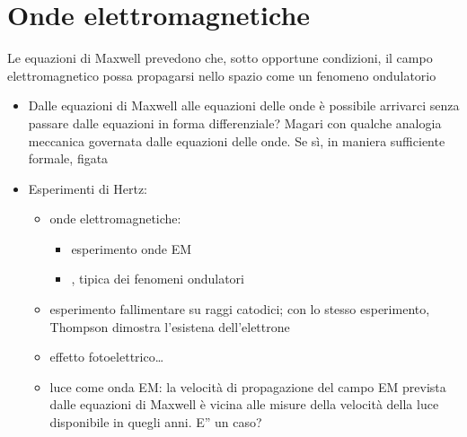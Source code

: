 \documentclass[letterpaper,10pt,italian]{jupyterBook}
\begin{document}
\chapter{Onde elettromagnetiche}
\label{\detokenize{ch/electromagnetism/em-waves:onde-elettromagnetiche}}\label{\detokenize{ch/electromagnetism/em-waves:physics-hs-electromagnetism-em-waves}}\label{\detokenize{ch/electromagnetism/em-waves::doc}}
\sphinxAtStartPar
Le equazioni di Maxwell prevedono che, sotto opportune condizioni, il campo elettromagnetico possa propagarsi nello spazio come un fenomeno ondulatorio
\begin{itemize}
\item {} 
\sphinxAtStartPar
Dalle equazioni di Maxwell alle equazioni delle onde  è possibile arrivarci senza passare dalle equazioni in forma differenziale? Magari con qualche analogia meccanica governata dalle equazioni delle onde. Se sì, in maniera sufficiente formale, figata

\item {} 
\sphinxAtStartPar
Esperimenti di Hertz:
\begin{itemize}
\item {} 
\sphinxAtStartPar
onde elettromagnetiche:
\begin{itemize}
\item {} 
\sphinxAtStartPar
esperimento onde EM

\item {} 
\sphinxAtStartPar
{}, tipica dei fenomeni ondulatori

\end{itemize}

\item {} 
\sphinxAtStartPar
esperimento fallimentare su raggi catodici; con lo stesso esperimento, Thompson dimostra l’esistena dell’elettrone

\item {} 
\sphinxAtStartPar
effetto fotoelettrico…

\item {} 
\sphinxAtStartPar
luce come onda EM: la velocità di propagazione del campo EM prevista dalle equazioni di Maxwell è vicina alle misure della velocità della luce disponibile in quegli anni. E” un caso?

\end{itemize}

\end{itemize}

\sphinxstepscope
\end{document}
